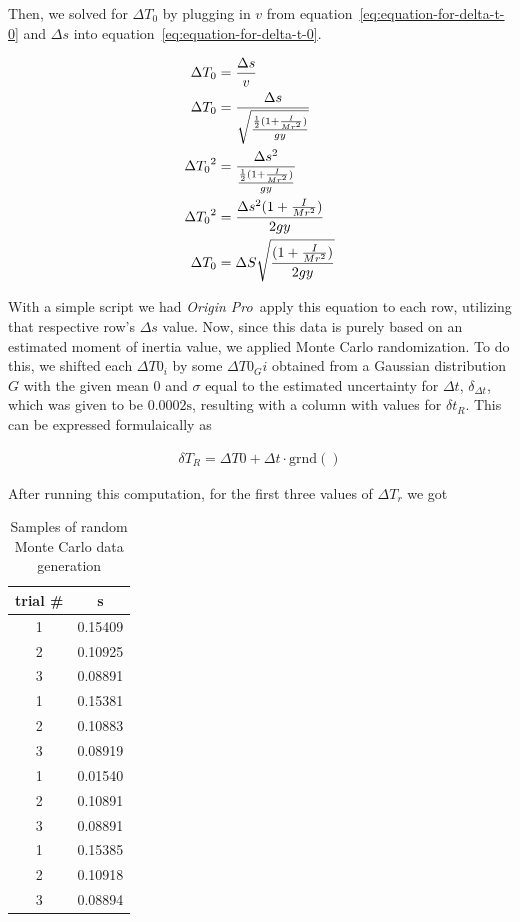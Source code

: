 \documentclass[coverpage]{article}
\newcommand{\softwareText}[1]{\textit{#1}\texttrademark}
\newcommand{\origin}{\softwareText{Origin Pro}}
\begin{document}
	Then, we solved for $\Delta{T_0}$ by plugging in $v$ from equation~\ref{eq:equation-for-delta-t-0} and $\Delta{s}$ into equation~\ref{eq:equation-for-delta-t-0}.
	
	\begin{align}
		\Delta{T_0}&= \frac{\Delta{s}}{v} \notag \\
		\Delta{T_0}&= \frac{\Delta{s}}{\sqrt{\frac{\frac{1}{2}(1 + \frac{I}{Mr^2})}{gy}}} \notag \\
		\Delta{T_0}^2&= \frac{\Delta{s}^2}{\frac{\frac{1}{2}(1 + \frac{I}{Mr^2})}{gy}} \notag \\
		\Delta{T_0}^2&= \frac{\Delta{s}^2 (1 + \frac{I}{M r^2})}{2gy} \notag \\
		\Delta{T_0}&= \Delta{S} \sqrt{\frac{(1 + \frac{I}{M r^2})}{2gy}}
	\end{align}

	With a simple script we had \origin~apply this equation to each row, utilizing that respective row's $\Delta{s}$ value. Now, since this data is purely based on an estimated moment of inertia value, we applied Monte Carlo randomization. To do this, we shifted each $\Delta{T0_i}$ by some $\Delta{T0_Gi}$ obtained from a Gaussian distribution $G$ with the given mean $0$ and $\sigma$ equal to the estimated uncertainty for $\Delta{t}$, $\delta_{\Delta{t}}$, which was given to be $0.0002 \text{s}$, resulting with a column with values for $\delta{t_R}$. This can be expressed formulaically as
	
	\begin{align}
		\delta{T_R} = \Delta{T0} + \Delta{t} \cdot \text{grnd}()
	\end{align}

	After running this computation, for the first three values of $\Delta{T_r}$ we got

	\begin{table}[h]
		\centering
		\caption{Samples of random Monte Carlo data generation}
		\begin{tabular}{c|c}
			trial \# & s \\ \hline
			1 & 0.15409 \\
			2 & 0.10925 \\
			3 & 0.08891 \\ \hline
			1 & 0.15381 \\
			2 & 0.10883 \\
			3 & 0.08919 \\ \hline
			1 & 0.01540 \\
			2 & 0.10891 \\
			3 & 0.08891 \\ \hline
			1 & 0.15385 \\
			2 & 0.10918 \\
			3 & 0.08894 \\
		\end{tabular}
	\end{table}
	
\end{document}
